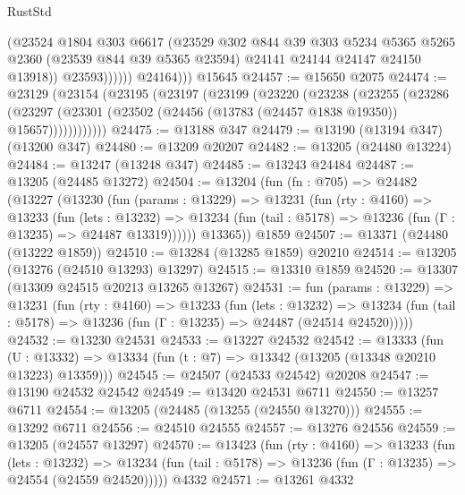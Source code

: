\begin{lexlean}{RustStd}
\begin{coremodule}
                      (@23524
                        @1804
                        @303
                        @6617
                        (@23529
                          @302
                          @844
                          @39
                          @303
                          @5234
                          @5365
                          @5265
                          @2360
                          (@23539 @844 @39 @5365 @23594)
                          @24141
                          @24144
                          @24147
                          @24150
                          @13918))
                      @23593))))))
          @24164)))
    @15645
@24457 := @15650 @2075
@24474 := @23129
    (@23154
      (@23195
        (@23197
          (@23199
            (@23220
              (@23238
                (@23255
                  (@23286
                    (@23297
                      (@23301 (@23502 (@24456 (@13783 (@24457 @1838 @19350)) @15657))))))))))))
@24475 := @13188 @347
@24479 := @13190 (@13194 @347) (@13200 @347)
@24480 := @13209 @20207
@24482 := @13205 (@24480 @13224)
@24484 := @13247 (@13248 @347)
@24485 := @13243 @24484
@24487 := @13205 (@24485 @13272)
@24504 := @13204
    (fun (fn : @705) =>
    @24482
      (@13227
        (@13230
          (fun (params : @13229) =>
          @13231
            (fun (rty : @4160) =>
            @13233
              (fun (lets : @13232) =>
              @13234 (fun (tail : @5178) => @13236 (fun (Γ : @13235) => @24487 @13319))))))
        @13365))
    @1859
@24507 := @13371 (@24480 (@13222 @1859))
@24510 := @13284 (@13285 @1859) @20210
@24514 := @13205 (@13276 (@24510 @13293) @13297)
@24515 := @13310 @1859
@24520 := @13307 (@13309 @24515 @20213 @13265 @13267)
@24531 := fun (params : @13229) =>
  @13231
    (fun (rty : @4160) =>
    @13233
      (fun (lets : @13232) =>
      @13234 (fun (tail : @5178) => @13236 (fun (Γ : @13235) => @24487 (@24514 @24520)))))
@24532 := @13230 @24531
@24533 := @13227 @24532
@24542 := @13333
    (fun (U : @13332) => @13334 (fun (t : @7) => @13342 (@13205 (@13348 @20210 @13223) @13359)))
@24545 := @24507 (@24533 @24542) @20208
@24547 := @13190 @24532 @24542
@24549 := @13420 @24531 @6711
@24550 := @13257 @6711
@24554 := @13205 (@24485 (@13255 (@24550 @13270)))
@24555 := @13292 @6711
@24556 := @24510 @24555
@24557 := @13276 @24556
@24559 := @13205 (@24557 @13297)
@24570 := @13423
    (fun (rty : @4160) =>
    @13233
      (fun (lets : @13232) =>
      @13234 (fun (tail : @5178) => @13236 (fun (Γ : @13235) => @24554 (@24559 @24520)))))
    @4332
@24571 := @13261 @4332

\end{coremodule}
\end{lexlean}
